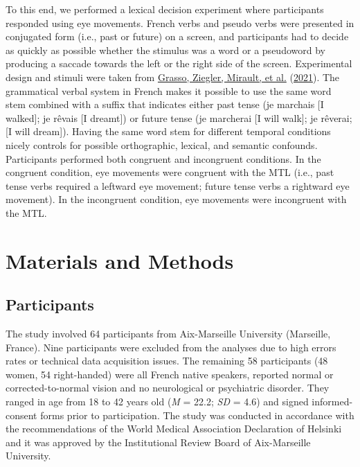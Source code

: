 \documentclass[
  a4paper,12pt,twoside,onecolumn,openright,final,oldfontcommands]{memoir}
\begin{document}
To this end, we performed a lexical decision experiment where participants responded using eye movements. French verbs and pseudo verbs were presented in conjugated form (i.e., past or future) on a screen, and participants had to decide as quickly as possible whether the stimulus was a word or a pseudoword by producing a saccade towards the left or the right side of the screen. Experimental design and stimuli were taken from \protect\hyperlink{ref-grasso_as_2021}{Grasso, Ziegler, Mirault, et al.} (\protect\hyperlink{ref-grasso_as_2021}{2021}). The grammatical verbal system in French makes it possible to use the same word stem combined with a suffix that indicates either past tense (je marchais {[}I walked{]}; je rêvais {[}I dreamt{]}) or future tense (je marcherai {[}I will walk{]}; je rêverai; {[}I will dream{]}). Having the same word stem for different temporal conditions nicely controls for possible orthographic, lexical, and semantic confounds. Participants performed both congruent and incongruent conditions. In the congruent condition, eye movements were congruent with the MTL (i.e., past tense verbs required a leftward eye movement; future tense verbs a rightward eye movement). In the incongruent condition, eye movements were incongruent with the MTL.

\hypertarget{materials-and-methods}{%
\section{Materials and Methods}\label{materials-and-methods}}

\hypertarget{participants-3}{%
\subsection{Participants}\label{participants-3}}

The study involved 64 participants from Aix-Marseille University (Marseille, France). Nine participants were excluded from the analyses due to high errors rates or technical data acquisition issues. The remaining 58 participants (48 women, 54 right-handed) were all French native speakers, reported normal or corrected-to-normal vision and no neurological or psychiatric disorder. They ranged in age from 18 to 42 years old (\emph{M} = 22.2; \emph{SD} = 4.6) and signed informed-consent forms prior to participation. The study was conducted in accordance with the recommendations of the World Medical Association Declaration of Helsinki and it was approved by the Institutional Review Board of Aix-Marseille University.
\end{document}
